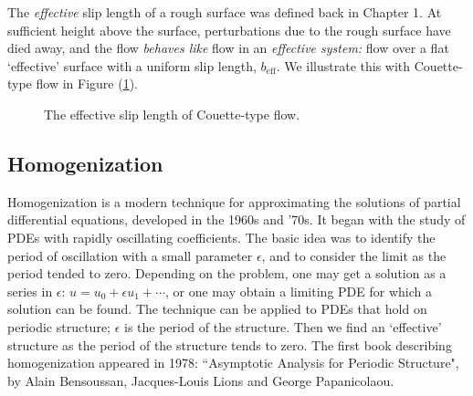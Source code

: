 \documentclass[12pt, a4paper, twoside, openright]{book}
\newcommand{\beff}{\ensuremath{b_{\mathrm{eff}}}}
\begin{document}
The \emph{effective} slip length of a rough surface was defined back in Chapter 1.  At sufficient height above the surface, perturbations due to the rough surface have died away, and the flow \emph{behaves like} flow in an \emph{effective system:} flow over a flat `effective' surface with a uniform slip length, $\beff$. We illustrate this with Couette-type flow in Figure (\ref{Couettelike}).

\begin{figure}[ht]
\centering
{}
\caption{The effective slip length of Couette-type flow.}\label{Couettelike}
\end{figure}


\subsection{Homogenization}

Homogenization is a modern technique for approximating the solutions of partial differential equations, developed in the 1960s and '70s.  It began with the study of PDEs with rapidly oscillating coefficients.  
The basic idea was to identify the period of oscillation with a small parameter $\epsilon$, and to consider the limit as the period tended to zero.  Depending on the problem, one may get a solution as a series in $\epsilon$: $u = u_0 + \epsilon u_1 + \cdots$, or one may obtain a limiting PDE for which a solution can be found.
The technique can be applied to PDEs that hold on periodic structure; $\epsilon$ is the period of the structure.  Then we find an `effective' structure as the period of the structure tends to zero.  The first book describing homogenization appeared in 1978: ``Asymptotic Analysis for Periodic Structure", by Alain Bensoussan, Jacques-Louis Lions and George Papanicolaou.  
\end{document}
